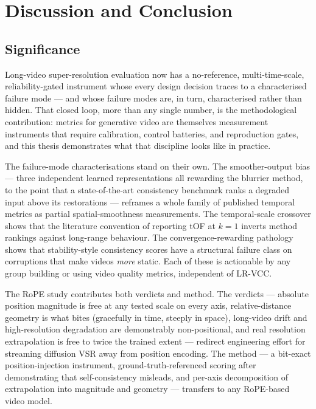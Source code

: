 \chapter{Discussion and Conclusion}
\label{ch:conclusion}

\section{Significance}
\label{sec:conclusion:significance}

Long-video super-resolution evaluation now has a no-reference, multi-time-scale,
reliability-gated instrument whose every design decision traces to a
characterised failure mode --- and whose failure modes are, in turn,
characterised rather than hidden. That closed loop, more than any single number,
is the methodological contribution: metrics for generative video are themselves
measurement instruments that require calibration, control batteries, and
reproduction gates, and this thesis demonstrates what that discipline looks like
in practice.

The failure-mode characterisations stand on their own. The smoother-output bias
--- three independent learned representations all rewarding the blurrier method,
to the point that a state-of-the-art consistency benchmark ranks a degraded
input above its restorations --- reframes a whole family of published temporal
metrics as partial spatial-smoothness measurements. The temporal-scale crossover
shows that the literature convention of reporting tOF at $k{=}1$ inverts method
rankings against long-range behaviour. The convergence-rewarding pathology shows
that stability-style consistency scores have a structural failure class on
corruptions that make videos \emph{more} static. Each of these is actionable by
any group building or using video quality metrics, independent of LR-VCC.

The RoPE study contributes both verdicts and method. The verdicts --- absolute
position magnitude is free at any tested scale on every axis, relative-distance
geometry is what bites (gracefully in time, steeply in space), long-video drift
and high-resolution degradation are demonstrably non-positional, and real
resolution extrapolation is free to twice the trained extent --- redirect
engineering effort for streaming diffusion VSR away from position encoding. The
method --- a bit-exact position-injection instrument, ground-truth-referenced
scoring after demonstrating that self-consistency misleads, and per-axis
decomposition of extrapolation into magnitude and geometry --- transfers to any
RoPE-based video model.

